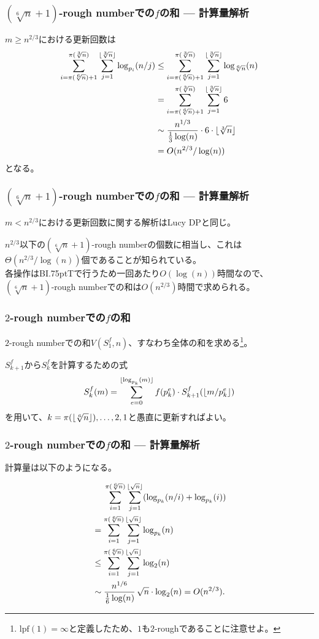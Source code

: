 \documentclass[
  lualatex,
  ja=standard,
  compress,
  hyperref={colorlinks, urlcolor=magenta, linkcolor=blue!55!black},
  dvipsnames,
  svgnames,
]{beamer}
\newcommand{\lpf}[1]{\mathrm{lpf}(#1)}
\newcommand{\BIT}{BI\kern.75ptT}
\begin{document}
\begin{frame}
  \frametitle{$(\sqrt[6]{n}+1)$-rough numberでの$f$の和 \theslidetopic{} — 計算量解析}

  $m\ge n^{2/3}$における更新回数は
  $$
  \begin{aligned}
    \sum_{i=\pi(\sqrt[6]{n})+1}^{\pi(\sqrt[3]{n})} \sum_{j=1}^{\lfloor\sqrt[3]{n}\rfloor} \log_{p_i}(n/j)
    &\le \sum_{i=\pi(\sqrt[6]{n})+1}^{\pi(\sqrt[3]{n})} \sum_{j=1}^{\lfloor\sqrt[3]{n}\rfloor} \log_{\sqrt[6]{n}}(n) \\
    &= \sum_{i=\pi(\sqrt[6]{n})+1}^{\pi(\sqrt[3]{n})} \sum_{j=1}^{\lfloor\sqrt[3]{n}\rfloor} 6 \\
    &\sim \frac{n^{1/3}}{\frac{1}{3}\log(n)}\cdot 6\cdot\lfloor\sqrt[3]{n}\rfloor \\
    &= O(n^{2/3}/\log(n))
  \end{aligned}
  $$
  となる。
\end{frame}

\begin{frame}
  \frametitle{$(\sqrt[6]{n}+1)$-rough numberでの$f$の和 \theslidetopic{} — 計算量解析}

  $m<n^{2/3}$における更新回数に関する解析はLucy DPと同じ。

  $n^{2/3}$以下の$(\sqrt[6]{n}+1)$-rough numberの個数に相当し、これは$\Theta(n^{2/3}/\log(n))$個であることが知られている。\\

  各操作は{\BIT}で行うため一回あたり$O(\log(n))$時間なので、$(\sqrt[6]{n}+1)$-rough numberでの和は$O(n^{2/3})$時間で求められる。
\end{frame}

\setcounter{slidetopic}{0}
\begin{frame}
  \frametitle{$2$-rough numberでの$f$の和 \theslidetopic}

  $2$-rough numberでの和$V(S_1^f, n)$、すなわち全体の和を求める\footnote{$\lpf{1}=\infty$と定義したため、$1$も$2$-roughであることに注意せよ。}。

  $S_{k+1}^f$から$S_k^f$を計算するための式
  $$
  S_k^f(m) = \sum_{e=0}^{\lfloor\log_{p_k}(m)\rfloor} f(p_k^e)\cdot S_{k+1}^f(\lfloor m/p_k^e\rfloor)
  $$
  を用いて、$k=\pi(\lfloor\sqrt[6]{n}\rfloor), \dots, 2, 1$と愚直に更新すればよい。
\end{frame}

\begin{frame}
  \frametitle{$2$-rough numberでの$f$の和 \theslidetopic{} — 計算量解析}

  計算量は以下のようになる。

  $$
  \begin{aligned}
    &\phantom{{} = {}}
    \sum_{i=1}^{\pi(\sqrt[6]{n})} \sum_{j=1}^{\floor{\sqrt{n}}} (\log_{p_k}(n/i) + \log_{p_k}(i)) \\
    &= \sum_{i=1}^{\pi(\sqrt[6]{n})} \sum_{j=1}^{\floor{\sqrt{n}}} \log_{p_k}(n) \\
    &\le \sum_{i=1}^{\pi(\sqrt[6]{n})} \sum_{j=1}^{\floor{\sqrt{n}}} \log_2(n) \\
    &\sim \frac{n^{1/6}}{\frac{1}{6}\log(n)} \, \sqrt{n}\cdot \log_2(n) = O(n^{2/3}).
  \end{aligned}
  $$
\end{frame}
\end{document}
